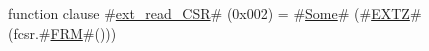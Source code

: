 function clause #\hyperref[sailRISCVzextzyreadzyCSR]{ext\_read\_CSR}# (0x002) = #\hyperref[sailRISCVzSome]{Some}# (#\hyperref[sailRISCVzEXTZ]{EXTZ}# (fcsr.#\hyperref[sailRISCVzFRM]{FRM}#()))
